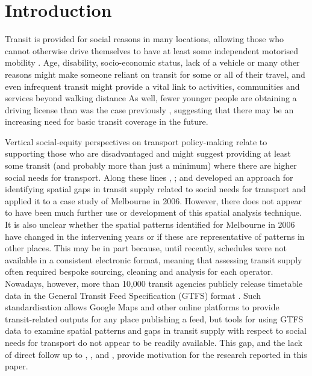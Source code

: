 \documentclass[preprint, 3p,
authoryear]{elsarticle} %
\begin{document}
\begin{frontmatter}
 \end{frontmatter}

\section{Introduction}\label{introduction}

Transit is provided for social reasons in many locations, allowing those
who cannot otherwise drive themselves to have at least some independent
motorised mobility \citep{Currie:2016aa}. Age, disability,
socio-economic status, lack of a vehicle or many other reasons might
make someone reliant on transit for some or all of their travel, and
even infrequent transit might provide a vital link to activities,
communities and services beyond walking distance As well, fewer younger
people are obtaining a driving license than was the case previously
\citep{delbosc2013causes}, suggesting that there may be an increasing
need for basic transit coverage in the future.

Vertical social-equity perspectives on transport policy-making relate to
supporting those who are disadvantaged \citep{Litman:2016aa} and might
suggest providing at least some transit (and probably more than just a
minimum) where there are higher social needs for transport. Along these
lines \citet{Currie2003Hobart}, \citet{Currie2004Gap};
\citet{Currie2007Identifying} and \citet{currie2010identifying}
developed an approach for identifying spatial gaps in transit supply
related to social needs for transport and applied it to a case study of
Melbourne in 2006. However, there does not appear to have been much
further use or development of this spatial analysis technique. It is
also unclear whether the spatial patterns identified for Melbourne in
2006 have changed in the intervening years or if these are
representative of patterns in other places. This may be in part because,
until recently, schedules were not available in a consistent electronic
format, meaning that assessing transit supply often required bespoke
sourcing, cleaning and analysis for each operator. Nowadays, however,
more than 10,000 transit agencies publicly release timetable data in the
General Transit Feed Specification (GTFS) format \citep{GTFS}. Such
standardisation allows Google Maps and other online platforms to provide
transit-related outputs for any place publishing a feed, but tools for
using GTFS data to examine spatial patterns and gaps in transit supply
with respect to social needs for transport do not appear to be readily
available. This gap, and the lack of direct follow up to
\citet{Currie2003Hobart}, \citet{Currie2004Gap},
\citet{Currie2007Identifying} and \citet{currie2010identifying}, provide
motivation for the research reported in this paper.
\end{document}
